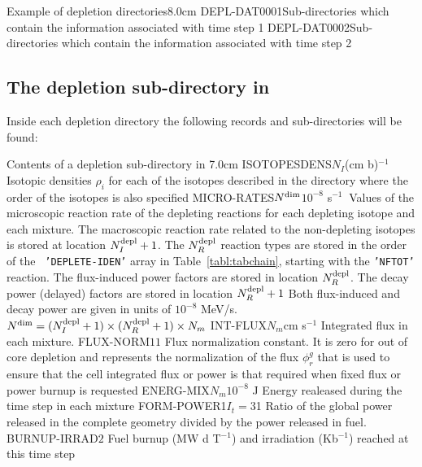 \begin{DescriptionEnregistrement}{Example of depletion directories}{8.0cm}
\DirEnr
  {DEPL-DAT0001}{Sub-directories which contain the information associated with
   time step 1}
\DirEnr
  {DEPL-DAT0002}{Sub-directories which contain the information associated with
   time step 2}
\end{DescriptionEnregistrement}

\clearpage

\subsection{The depletion sub-directory  in
}\label{sect:burnupdirdepletion}

Inside each depletion directory the following records and sub-directories will be found:

\begin{DescriptionEnregistrement}{Contents of a depletion sub-directory in }{7.0cm}
\RealEnr
  {ISOTOPESDENS}{$N_{I}$}{(cm b)$^{-1}$}
  {Isotopic densities $\rho_{i}$ for each of the isotopes described in the  directory
   where the order of the isotopes is also specified}
\RealEnr
  {MICRO-RATES}{$N^{\rm dim}$}{$10^{-8}$ s$^{-1}\ $}
  {Values of the microscopic reaction rate of the depleting reactions for each
   depleting isotope and each mixture. The macroscopic reaction rate related to the
   non-depleting isotopes is stored at location $N^{\rm depl}_{I}+1$. The
   $N^{\rm depl}_{R}$ reaction types are stored in the order of the {\tt
   'DEPLETE-IDEN'} array in Table~\ref{tabl:tabchain}, starting with the {\tt 'NFTOT'}
   reaction. The flux-induced power factors are stored in location $N^{\rm depl}_{R}$.
   The decay power (delayed) factors are stored in location $N^{\rm depl}_{R}+1$ Both
   flux-induced and decay power are given in units of $10^{-8}$ MeV/s.
   $N^{\rm dim}=(N^{\rm depl}_{I}+1)
   \times (N^{\rm depl}_{R}+1) \times N_m$}
\RealEnr
  {INT-FLUX}{$N_m$}{cm s$^{-1}$}
  {Integrated flux in each mixture.}
\RealEnr
  {FLUX-NORM}{$1$}{$1$}
  {Flux normalization constant. It is zero for out of core depletion and
   represents the
   normalization of the flux $\phi_{r}^{g}$ that is used to ensure that the cell integrated flux or
   power is that required when fixed flux or power burnup is requested}
\RealEnr
  {ENERG-MIX}{$N_m$}{$10^{-8}$ J}
  {Energy realeased during the time step in each mixture}
\OptRealEnr
  {FORM-POWER}{1}{$I_{t}=3$}{1}
  {Ratio of the global power released in the complete geometry divided by the
   power released in fuel.}
\RealEnr
  {BURNUP-IRRAD}{$2$}{}
  {Fuel burnup (MW d T$^{-1}$) and irradiation (Kb$^{-1}$) reached at this time step}
\end{DescriptionEnregistrement}

\eject
